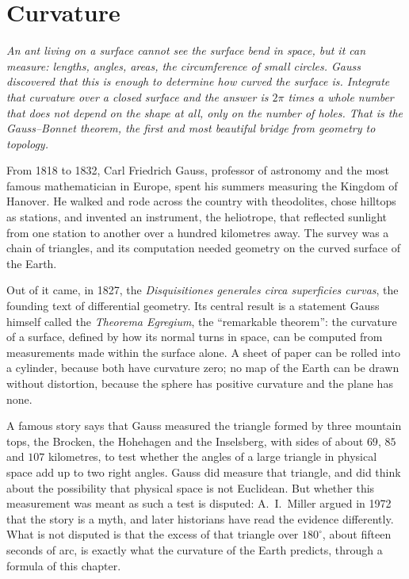 \chapter{Curvature}

\begin{center}\itshape
An ant living on a surface cannot see the surface bend in space, but it can measure: lengths, angles, areas, the circumference of small circles. Gauss
discovered that this is enough to determine how curved the surface is. Integrate that curvature over a closed surface and the answer is $2\pi$ times a
whole number that does not depend on the shape at all, only on the number of holes. That is the Gauss--Bonnet theorem, the first and most beautiful
bridge from geometry to topology.
\end{center}

From 1818 to 1832, Carl Friedrich Gauss, professor of astronomy and the most famous mathematician in Europe, spent his summers measuring the Kingdom of
Hanover. He walked and rode across the country with theodolites, chose hilltops as stations, and invented an instrument, the heliotrope, that reflected
sunlight from one station to another over a hundred kilometres away. The survey was a chain of triangles, and its computation needed geometry on the
curved surface of the Earth.

Out of it came, in 1827, the \emph{Disquisitiones generales circa superficies curvas}, the founding text of differential geometry. Its central result is
a statement Gauss himself called the \emph{Theorema Egregium}, the ``remarkable theorem'': the curvature of a surface, defined by how its normal turns in
space, can be computed from measurements made within the surface alone. A sheet of paper can be rolled into a cylinder, because both have curvature zero;
no map of the Earth can be drawn without distortion, because the sphere has positive curvature and the plane has none.

A famous story says that Gauss measured the triangle formed by three mountain tops, the Brocken, the Hohehagen and the Inselsberg, with sides of about
$69$, $85$ and $107$ kilometres, to test whether the angles of a large triangle in physical space add up to two right angles. Gauss did measure that
triangle, and did think about the possibility that physical space is not Euclidean. But whether this measurement was meant as such a test is disputed:
A.~I.~Miller argued in 1972 that the story is a myth, and later historians have read the evidence differently. What is not disputed is that the excess
of that triangle over $180^\circ$, about fifteen seconds of arc, is exactly what the curvature of the Earth predicts, through a formula of this chapter.


